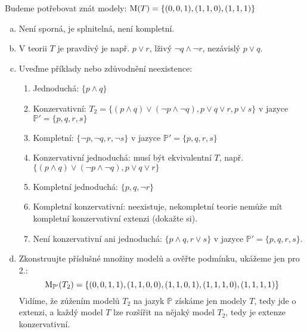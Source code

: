 \begin{problem}
    \begin{solution}
        Budeme potřebovat znát modely: $\operatorname{M}(T)=\{(0,0,1),(1,1,0),(1,1,1)\}$
        \begin{enumerate}[(a)]
            \item Není sporná, je splnitelná, není kompletní.
            \item V teorii $T$ je pravdivý je např. $p\lor r$, lživý $\neg q\land\neg r$, nezávislý $p\lor q$.  
            \item Uveďme příklady nebo zdůvodnění neexistence:
            \begin{enumerate}[1.]
                \item Jednoduchá: $\{p\land q\}$
                \item Konzervativní: $T_2=\{(p\land q)\lor(\neg p\land\neg q), p\lor q\lor r,p\lor s\}$ v jazyce $\mathbb P'=\{p,q,r,s\}$
                \item Kompletní: $\{\neg p,\neg q,r,\neg s\}$ v jazyce $\mathbb P'=\{p,q,r,s\}$
                \item Konzervativní jednoduchá: musí být ekvivalentní $T$, např. $\{(p\land q)\lor(\neg p\land\neg q), p\lor q\lor r\}$
                \item Kompletní jednoduchá: $\{p,q,\neg r\}$
                \item Kompletní konzervativní: neexistuje, nekompletní teorie nemůže mít kompletní konzervativní extenzi (dokažte si).
                \item Není konzervativní ani jednoduchá: $\{p\land q,r\lor s\}$ v jazyce $\mathbb P'=\{p,q,r,s\}$.
            \end{enumerate}
            \item Zkonstruujte příslušné množiny modelů a ověřte podmínku, ukážeme jen pro 2.:
            $$
            \operatorname{M}_{\mathbb P'}(T_2)=\{(0,0,1,1),(1,1,0,0),(1,1,0,1),(1,1,1,0),(1,1,1,1)\}
            $$
            Vidíme, že zúžením modelů $T_2$ na jazyk $\mathbb P$ získáme jen modely $T$, tedy jde o extenzi, a každý model $T$ lze rozšířit na nějaký model $T_2$, tedy je extenze konzervativní.
        \end{enumerate}
            
    \end{solution}
    
\end{problem}


